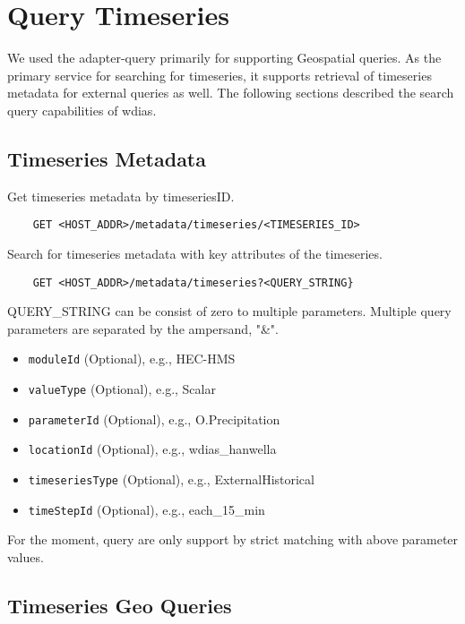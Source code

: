 \section{Query Timeseries}
\label{se:query}

We used the adapter-query primarily for supporting Geospatial queries. As the primary service for searching for timeseries, it supports retrieval of timeseries metadata for external queries as well. The following sections described the search query capabilities of \acrshort{wdias}.

\subsection{Timeseries Metadata}
Get timeseries metadata by timeseriesID.
\begin{lstlisting}
    GET <HOST_ADDR>/metadata/timeseries/<TIMESERIES_ID>
\end{lstlisting}

Search for timeseries metadata with key attributes of the timeseries.
\begin{lstlisting}
    GET <HOST_ADDR>/metadata/timeseries?<QUERY_STRING}
\end{lstlisting}

QUERY\_STRING can be consist of zero to multiple parameters. Multiple query parameters are separated by the ampersand, "\&".
\begin{itemize}
    \item \texttt{moduleId} (Optional), e.g., HEC-HMS
    \item \texttt{valueType} (Optional), e.g., Scalar
    \item \texttt{parameterId} (Optional), e.g., O.Precipitation
    \item \texttt{locationId} (Optional), e.g., wdias\_hanwella
    \item \texttt{timeseriesType} (Optional), e.g., ExternalHistorical
    \item \texttt{timeStepId} (Optional), e.g., each\_15\_min
\end{itemize}
For the moment, query are only support by strict matching with above parameter values.

\subsection{Timeseries Geo Queries}

